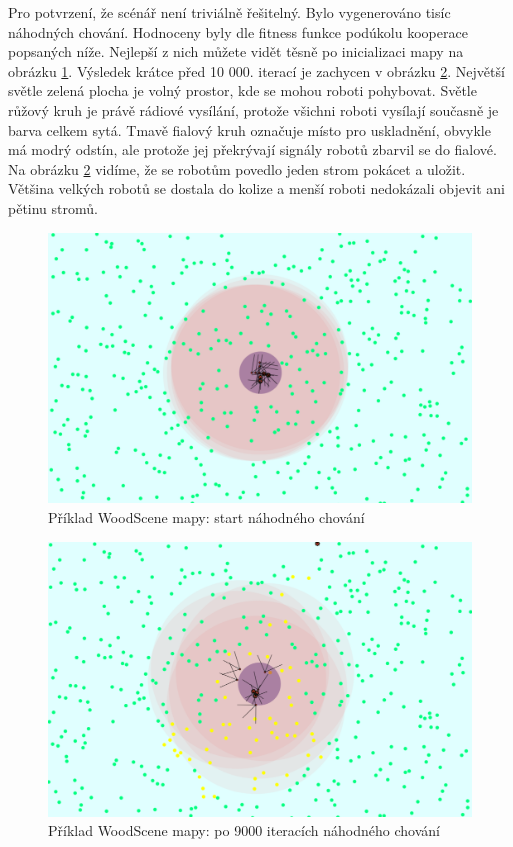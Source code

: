 \par
Pro potvrzení, že scénář není triviálně řešitelný. Bylo vygenerováno tisíc náhodných chování. Hodnoceny byly dle fitness funkce podúkolu kooperace popsaných níže. Nejlepší z nich můžete vidět těsně po inicializaci mapy na obrázku \ref{obr04:WoodSceneRandomStart}. Výsledek krátce před 10 000. iterací je zachycen v obrázku \ref{obr04:WoodSceneRandomEnd}. Největší světle zelená plocha je volný prostor, kde se mohou roboti pohybovat. Světle růžový kruh je právě rádiové vysílání, protože všichni roboti vysílají současně je barva celkem sytá. Tmavě fialový kruh označuje místo pro uskladnění, obvykle má modrý odstín, ale protože jej překrývají signály robotů zbarvil se do fialové. Na obrázku \ref{obr04:WoodSceneRandomEnd} vidíme, že se robotům povedlo jeden strom pokácet a uložit. Většina velkých robotů se dostala do kolize a menší roboti nedokázali objevit ani pětinu stromů.
\clearpage
\begin{figure}[p]\centering
	\includegraphics[width=\columnwidth]{../img/WoodMap/pictures/StartRandom.png}
	\caption{Příklad WoodScene mapy: start náhodného chování}
	\label{obr04:WoodSceneRandomStart}
\end{figure}
\par
\begin{figure}[p]\centering
	\includegraphics[width=\columnwidth]{../img/WoodMap/pictures/EndRandom.png}
	\caption{Příklad WoodScene mapy: po 9000 iteracích náhodného chování}
	\label{obr04:WoodSceneRandomEnd}
\end{figure}
\clearpage

